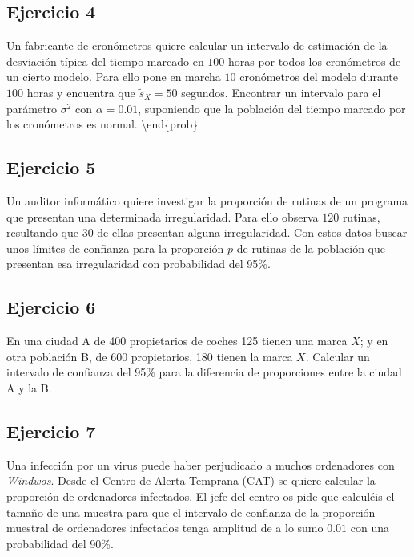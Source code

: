 \documentclass[
]{article}
\begin{document}
\hypertarget{ejercicio-4}{%
\subsection{Ejercicio 4}\label{ejercicio-4}}

Un fabricante de cronómetros quiere calcular un intervalo de estimación
de la desviación típica del tiempo marcado en \(100\) horas por todos
los cronómetros de un cierto modelo. Para ello pone en marcha \(10\)
cronómetros del modelo durante \(100\) horas y encuentra que
\(\tilde{s}_{X}=50\) segundos. Encontrar un intervalo para el parámetro
\(\sigma^2\) con \(\alpha=0.01\), suponiendo que la población del tiempo
marcado por los cronómetros es normal.
 \textbackslash end\{prob\}

\hypertarget{ejercicio-5}{%
\subsection{Ejercicio 5}\label{ejercicio-5}}

Un auditor informático quiere investigar la proporción de rutinas de un
programa que presentan una determinada irregularidad. Para ello observa
\(120\) rutinas, resultando que \(30\) de ellas presentan alguna
irregularidad. Con estos datos buscar unos límites de confianza para la
proporción \(p\) de rutinas de la población que presentan esa
irregularidad con probabilidad del 95\%.


\hypertarget{ejercicio-6}{%
\subsection{Ejercicio 6}\label{ejercicio-6}}

En una ciudad A de 400 propietarios de coches 125 tienen una marca
\(X\); y en otra población B, de 600 propietarios, 180 tienen la marca
\(X\). Calcular un intervalo de confianza del 95\% para la diferencia de
proporciones entre la ciudad A y la B.

\hypertarget{ejercicio-7}{%
\subsection{Ejercicio 7}\label{ejercicio-7}}

Una infección por un virus puede haber perjudicado a muchos ordenadores
con \emph{Windwos}. Desde el Centro de Alerta Temprana (CAT) se quiere
calcular la proporción de ordenadores infectados. El jefe del centro os
pide que calculéis el tamaño de una muestra para que el intervalo de
confianza de la proporción muestral de ordenadores infectados tenga
amplitud de a lo sumo \(0.01\) con una probabilidad del 90\%.
\end{document}
